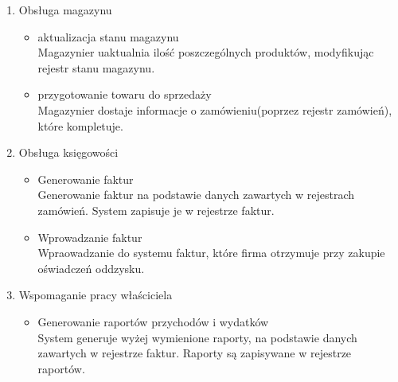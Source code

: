 \begin{enumerate}
	\item Obsługa magazynu
		\begin{itemize}
		\item aktualizacja stanu magazynu \\
	 	Magazynier uaktualnia ilość poszczególnych produktów, modyfikując rejestr stanu magazynu.
	 	\item przygotowanie towaru do sprzedaży \\
	 	Magazynier dostaje informacje o zamówieniu(poprzez rejestr zamówień), które kompletuje.
		\end{itemize}

	\item Obsługa księgowości
		\begin{itemize}
		\item Generowanie faktur \\ 
		Generowanie faktur na podstawie danych zawartych w rejestrach zamówień. System zapisuje je w rejestrze faktur.
		\item Wprowadzanie faktur \\
		Wpraowadzanie do systemu faktur, które firma otrzymuje przy zakupie oświadczeń oddzysku.
		\end{itemize}

	\item Wspomaganie pracy właściciela
		\begin{itemize}
		\item Generowanie raportów przychodów i wydatków\\
		System generuje wyżej wymienione raporty, na podstawie danych zawartych w rejestrze faktur. Raporty są zapisywane w rejestrze raportów.
		\end{itemize}

\end{enumerate}